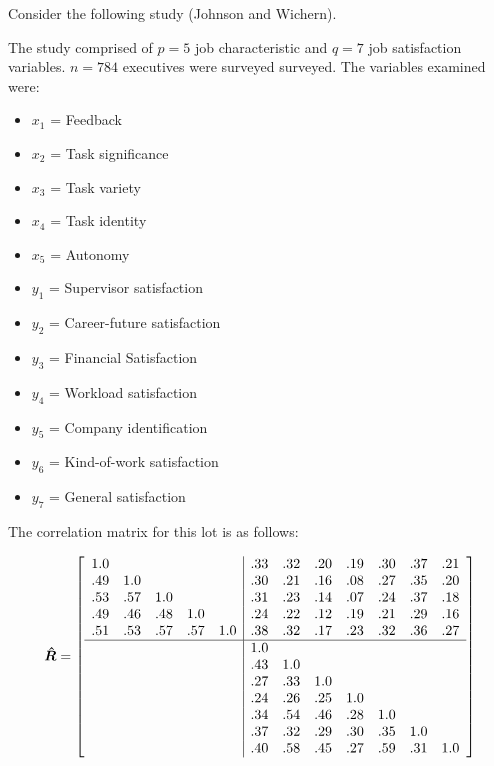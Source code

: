 Consider the following study (Johnson and Wichern).

The study comprised of $p=5$ job characteristic and $q=7$ job satisfaction variables.   $n=784$ executives were surveyed surveyed.   The variables examined were:
  
  \begin{itemize}
\item  $x_{1}$ = Feedback
\item  $x_{2}$ = Task significance
\item $x_{3}$ = Task variety
\item $x_{4}$ = Task identity
\item $x_{5}$ = Autonomy
   \end{itemize}
   
  \begin{itemize}
\item  $y_{1}$ = Supervisor satisfaction
\item  $y_{2}$ = Career-future satisfaction
\item $y_{3}$ = Financial Satisfaction
\item $y_{4}$ = Workload satisfaction
\item $y_{5}$ = Company identification
\item $y_{6}$ = Kind-of-work satisfaction
\item $y_{7}$ = General satisfaction
   \end{itemize}  



The correlation matrix for this lot is as follows:

\begin{displaymath}
\boldsymbol{\hat{R}} = \left[ \begin{array}{rrrrr|rrrrrrr}
1.0 & & & & & .33 & .32 & .20 & .19 & .30 & .37 & .21 \\
.49 & 1.0 & & & & .30 & .21 & .16 & .08 & .27 & .35 & .20 \\
.53 & .57 & 1.0 & & & .31 & .23 & .14 & .07 & .24 & .37 & .18 \\
.49 & .46 & .48 & 1.0 & & .24 & .22 & .12 & .19 & .21 & .29 & .16 \\
.51 & .53 & .57 & .57 & 1.0 & .38 & .32 & .17 & .23 & .32 & .36 & .27 \\
\hline
 & & & & & 1.0 & & & & & & \\
 & & & & & .43 & 1.0 & & & & & \\
 & & & & & .27 & .33 & 1.0 & & & &\\
 & & & & & .24 & .26 & .25 & 1.0 & & & \\
 & & & & & .34 & .54 & .46 & .28 & 1.0 & & \\
 & & & & & .37 & .32 & .29 & .30 & .35 & 1.0 & \\
 & & & & & .40 & .58 & .45 & .27 & .59 & .31 & 1.0\\
 \end{array} \right]
 \end{displaymath}



